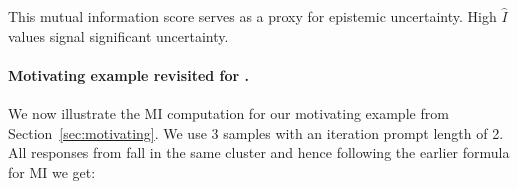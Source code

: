 

This mutual information score serves as a proxy for epistemic uncertainty. 
High \(\hat{I}\) values signal significant uncertainty.

\paragraph{Motivating example revisited for \textnormal{\gptturbo}.}
We now illustrate the MI computation for our motivating example from Section~\ref{sec:motivating}. 
We use 3 samples with an iteration prompt length of 2.
All responses from \gptturbo fall in the same cluster and hence following the earlier formula for MI we get:

